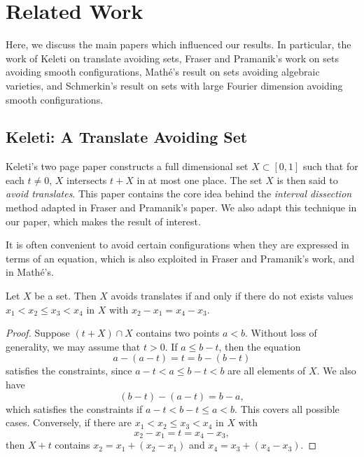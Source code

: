
\chapter{Related Work}
\label{ch:RelatedWork}

Here, we discuss the main papers which influenced our results. In particular, the work of Keleti on translate avoiding sets, Fraser and Pramanik's work on sets avoiding smooth configurations, Math\'{e}'s result on sets avoiding algebraic varieties, and Schmerkin's result on sets with large Fourier dimension avoiding smooth configurations.

\section{Keleti: A Translate Avoiding Set}

Keleti's two page paper constructs a full dimensional set $X \subset [0,1]$ such that for each $t \neq 0$, $X$ intersects $t + X$ in at most one place. The set $X$ is then said to \emph{avoid translates}. This paper contains the core idea behind the \emph{interval dissection} method adapted in Fraser and Pramanik's paper. We also adapt this technique in our paper, which makes the result of interest.

It is often convenient to avoid certain configurations when they are expressed in terms of an equation, which is also exploited in Fraser and Pramanik's work, and in Math\'{e}'s.

\begin{lemma}
    Let $X$ be a set. Then $X$ avoids translates if and only if there do not exists values $x_1 < x_2 \leq x_3 < x_4$ in $X$ with $x_2 - x_1 = x_4 - x_3$.
\end{lemma}
\begin{proof}

    Suppose $(t + X) \cap X$ contains two points $a < b$. Without loss of generality, we may assume that $t > 0$. If $a \leq b - t$, then the equation
    \[ a - (a - t) = t = b - (b - t) \]
    satisfies the constraints, since $a - t < a \leq b - t < b$ are all elements of $X$. We also have
    \[ (b - t) - (a - t) = b - a, \]
    which satisfies the constraints if $a - t < b - t \leq a < b$. This covers all possible cases. Conversely, if there are $x_1 < x_2 \leq x_3 < x_4$ in $X$ with
    \[ x_2 - x_1 = t = x_4 - x_3, \]
    then $X + t$ contains $x_2 = x_1 + (x_2 - x_1)$ and $x_4 = x_3 + (x_4 - x_3)$.
\end{proof}

